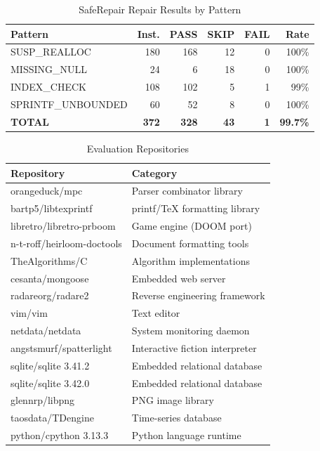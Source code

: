 \documentclass[conference]{IEEEtran}
\begin{document}
\begin{table}[t]
\caption{SafeRepair Repair Results by Pattern}
\label{tab:results}
\begin{center}
\begin{tabular}{lrrrrr}
\hline
\textbf{Pattern} & \textbf{Inst.} & \textbf{PASS} & \textbf{SKIP} &
\textbf{FAIL} & \textbf{Rate} \\
\hline
SUSP\_REALLOC      & 180 & 168 & 12 & 0 & 100\% \\
MISSING\_NULL      &  24 &   6 & 18 & 0 & 100\% \\
INDEX\_CHECK       & 108 & 102 &  5 & 1 &  99\% \\
SPRINTF\_UNBOUNDED &  60 &  52 &  8 & 0 & 100\% \\
\hline
\textbf{TOTAL} & \textbf{372} & \textbf{328} & \textbf{43} &
\textbf{1} & \textbf{99.7\%} \\
\hline
\end{tabular}
\end{center}
\end{table}

\begin{table}[t]
\caption{Evaluation Repositories}
\label{tab:repos}
\begin{center}
{\footnotesize
\begin{tabular}{ll}
\hline
\textbf{Repository} & \textbf{Category} \\
\hline
orangeduck/mpc          & Parser combinator library \\
bartp5/libtexprintf     & printf/\TeX{} formatting library \\
libretro/libretro-prboom & Game engine (DOOM port) \\
n-t-roff/heirloom-doctools & Document formatting tools \\
TheAlgorithms/C         & Algorithm implementations \\
cesanta/mongoose        & Embedded web server \\
radareorg/radare2       & Reverse engineering framework \\
vim/vim                 & Text editor \\
netdata/netdata         & System monitoring daemon \\
angstsmurf/spatterlight & Interactive fiction interpreter \\
sqlite/sqlite 3.41.2    & Embedded relational database \\
sqlite/sqlite 3.42.0    & Embedded relational database \\
glennrp/libpng          & PNG image library \\
taosdata/TDengine       & Time-series database \\
python/cpython 3.13.3   & Python language runtime \\
\hline
\end{tabular}}
\end{center}
\end{table}
\end{document}
